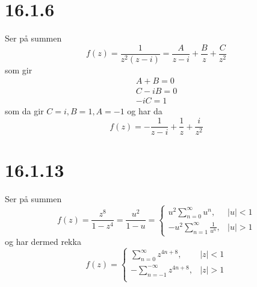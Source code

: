 \documentclass{report}
\begin{document}
\section*{16.1.6}
Ser på summen
\begin{equation}
  \label{eq:33}
  f(z) = \frac{1}{z^{2}(z-i)} = \frac{A}{z-i} + \frac{B}{z} + \frac{C}{z^{2}}
\end{equation}
som gir
\begin{equation}
  \label{eq:35}
  \begin{array}{l}
    A + B = 0 \\
    C - iB = 0 \\
    -iC = 1
  \end{array}
\end{equation}
som da gir $C = i, B = 1, A = -1$ og har da
\begin{equation}
  \label{eq:36}
  f(z) = -\frac{1}{z-i} + \frac{1}{z} + \frac{i}{z^{2}}
\end{equation}


\section*{16.1.13}
Ser på summen
\begin{equation}
  \label{eq:38}
  f(z) = \frac{z^{8}}{1-z^{4}} = \frac{u^{2}}{1-u} = \left\lbrace
    \begin{array}{ll}
      u^{2} \sum_{n=0}^{\infty} u^{n}, & |u| < 1 \\
      -u^{2} \sum_{n=1}^{\infty} \frac{1}{u^{n}}, & |u| > 1
    \end{array} \right.
\end{equation}
og har dermed rekka
\begin{equation}
  \label{eq:39}
  f(z) = \left\lbrace
    \begin{array}{ll}
      \sum_{n=0}^{\infty} z^{4n+8} , & |z| < 1 \\
      - \sum_{n=-1}^{-\infty} z^{4n+8} , & |z| > 1 \\
    \end{array}
    \right.
\end{equation}
\end{document}
